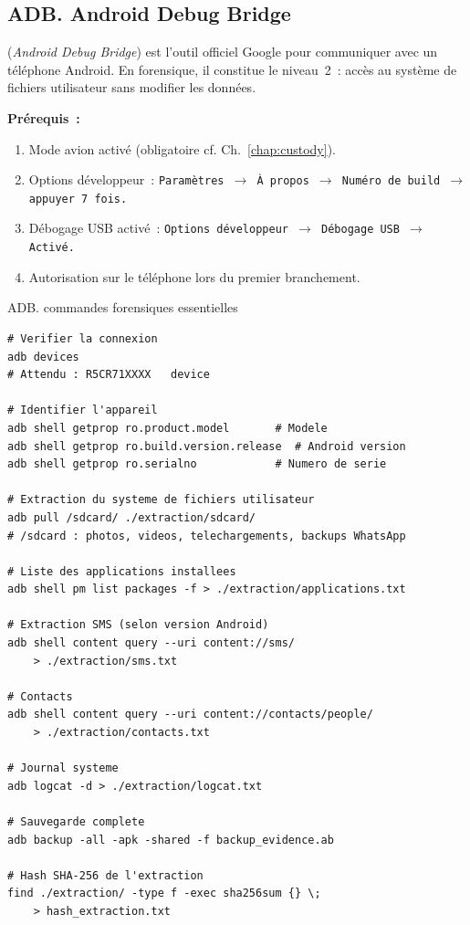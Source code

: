 \subsection{ADB. Android Debug Bridge}

 (\textit{Android Debug Bridge}) est l'outil
officiel Google pour communiquer avec un téléphone Android. En forensique,
il constitue le niveau~2~: accès au système de fichiers utilisateur sans
modifier les données.

\textbf{Prérequis~:}
\begin{enumerate}
    \item Mode avion activé (obligatoire cf. Ch.~\ref{chap:custody}).
    \item Options développeur~: \texttt{Paramètres~$\to$ À propos~$\to$
          Numéro de build~$\to$ appuyer 7~fois.}
    \item Débogage USB activé~: \texttt{Options développeur~$\to$
          Débogage USB~$\to$ Activé.}
    \item Autorisation sur le téléphone lors du premier branchement.
\end{enumerate}

\begin{boxoutils}{ADB. commandes forensiques essentielles}
\begin{lstlisting}[language=bash_forensique]
# Verifier la connexion
adb devices
# Attendu : R5CR71XXXX   device

# Identifier l'appareil
adb shell getprop ro.product.model       # Modele
adb shell getprop ro.build.version.release  # Android version
adb shell getprop ro.serialno            # Numero de serie

# Extraction du systeme de fichiers utilisateur
adb pull /sdcard/ ./extraction/sdcard/
# /sdcard : photos, videos, telechargements, backups WhatsApp

# Liste des applications installees
adb shell pm list packages -f > ./extraction/applications.txt

# Extraction SMS (selon version Android)
adb shell content query --uri content://sms/
    > ./extraction/sms.txt

# Contacts
adb shell content query --uri content://contacts/people/
    > ./extraction/contacts.txt

# Journal systeme
adb logcat -d > ./extraction/logcat.txt

# Sauvegarde complete
adb backup -all -apk -shared -f backup_evidence.ab

# Hash SHA-256 de l'extraction
find ./extraction/ -type f -exec sha256sum {} \;
    > hash_extraction.txt
\end{lstlisting}
\end{boxoutils}


